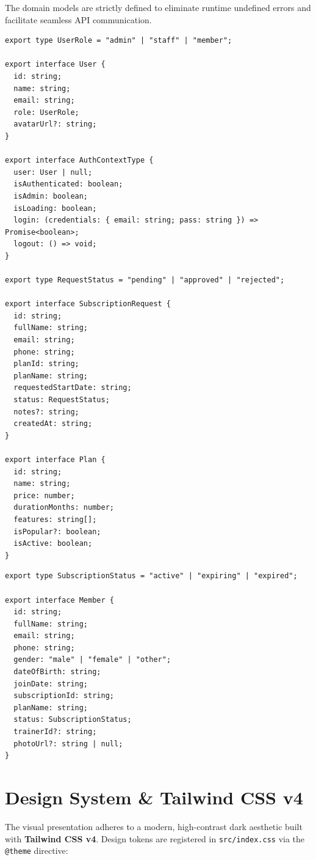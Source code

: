 \documentclass[11pt,a4paper]{article}
\begin{document}
The domain models are strictly defined to eliminate runtime undefined errors and facilitate seamless API communication.

\begin{lstlisting}[caption={types/auth.types.ts \& types/subscription.types.ts}]
export type UserRole = "admin" | "staff" | "member";

export interface User {
  id: string;
  name: string;
  email: string;
  role: UserRole;
  avatarUrl?: string;
}

export interface AuthContextType {
  user: User | null;
  isAuthenticated: boolean;
  isAdmin: boolean;
  isLoading: boolean;
  login: (credentials: { email: string; pass: string }) => Promise<boolean>;
  logout: () => void;
}

export type RequestStatus = "pending" | "approved" | "rejected";

export interface SubscriptionRequest {
  id: string;
  fullName: string;
  email: string;
  phone: string;
  planId: string;
  planName: string;
  requestedStartDate: string;
  status: RequestStatus;
  notes?: string;
  createdAt: string;
}

export interface Plan {
  id: string;
  name: string;
  price: number;
  durationMonths: number;
  features: string[];
  isPopular?: boolean;
  isActive: boolean;
}
\end{lstlisting}

\begin{lstlisting}[caption={types/member.types.ts}]
export type SubscriptionStatus = "active" | "expiring" | "expired";

export interface Member {
  id: string;
  fullName: string;
  email: string;
  phone: string;
  gender: "male" | "female" | "other";
  dateOfBirth: string;
  joinDate: string;
  subscriptionId: string;
  planName: string;
  status: SubscriptionStatus;
  trainerId?: string;
  photoUrl?: string | null;
}
\end{lstlisting}

\newpage
\section{Design System \& Tailwind CSS v4}

The visual presentation adheres to a modern, high-contrast dark aesthetic built with \textbf{Tailwind CSS v4}. Design tokens are registered in \texttt{src/index.css} via the \texttt{@theme} directive:
\end{document}
